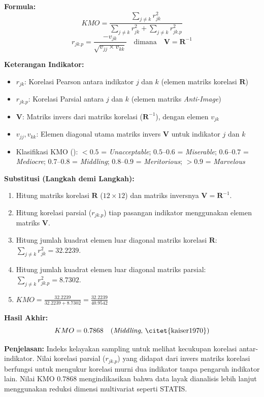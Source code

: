 \documentclass[11pt,a4paper]{article}
\begin{document}
\begin{tcolorbox}[formula_box, title={10. Kaiser-Meyer-Olkin (KMO) dan Korelasi Parsial}] \label{kotak:kmo}
\textbf{Formula:}
\[ KMO = \frac{\sum_{j \neq k} r_{jk}^2}{\sum_{j \neq k} r_{jk}^2 + \sum_{j \neq k} r_{jk.p}^2} \]
\[ r_{jk.p} = \frac{-v_{jk}}{\sqrt{v_{jj} \times v_{kk}}} \quad \text{dimana} \quad \mathbf{V} = \mathbf{R}^{-1} \]

\textbf{Keterangan Indikator:}
\begin{itemize}
  \item $r_{jk}$: Korelasi Pearson antara indikator $j$ dan $k$ (elemen matriks korelasi $\mathbf{R}$)
  \item $r_{jk.p}$: Korelasi Parsial antara $j$ dan $k$ (elemen matriks \textit{Anti-Image})
  \item $\mathbf{V}$: Matriks invers dari matriks korelasi ($\mathbf{R}^{-1}$), dengan elemen $v_{jk}$
  \item $v_{jj}, v_{kk}$: Elemen diagonal utama matriks invers $\mathbf{V}$ untuk indikator $j$ dan $k$
  \item Klasifikasi KMO (\citet{kaiser1970}): $<0.5$ = \textit{Unacceptable}; $0.5$--$0.6$ = \textit{Miserable}; $0.6$--$0.7$ = \textit{Mediocre}; $0.7$--$0.8$ = \textit{Middling}; $0.8$--$0.9$ = \textit{Meritorious}; $>0.9$ = \textit{Marvelous}
\end{itemize}

\textbf{Substitusi (Langkah demi Langkah):}
\begin{enumerate}
  \item Hitung matriks korelasi $\mathbf{R}$ ($12 \times 12$) dan matriks inversnya $\mathbf{V} = \mathbf{R}^{-1}$.
  \item Hitung korelasi parsial ($r_{jk.p}$) tiap pasangan indikator menggunakan elemen matriks $\mathbf{V}$.
  \item Hitung jumlah kuadrat elemen luar diagonal matriks korelasi $\mathbf{R}$: $\sum_{j\neq k} r_{jk}^2 = 32.2239$.
  \item Hitung jumlah kuadrat elemen luar diagonal matriks parsial: $\sum_{j\neq k} r_{jk.p}^2 = 8.7302$.
  \item $KMO = \frac{32.2239}{32.2239 + 8.7302} = \frac{32.2239}{40.9542}$
\end{enumerate}

\textbf{Hasil Akhir:}
\[ KMO = 0.7868 \quad \text{(\textit{Middling}, \citet{kaiser1970})} \]

\textbf{Penjelasan:} Indeks kelayakan sampling untuk melihat kecukupan korelasi antar-indikator. Nilai korelasi parsial ($r_{jk.p}$) yang didapat dari invers matriks korelasi berfungsi untuk mengukur korelasi murni dua indikator tanpa pengaruh indikator lain. Nilai KMO $0.7868$ mengindikasikan bahwa data layak dianalisis lebih lanjut menggunakan reduksi dimensi multivariat seperti STATIS.
\end{tcolorbox}
\end{document}
